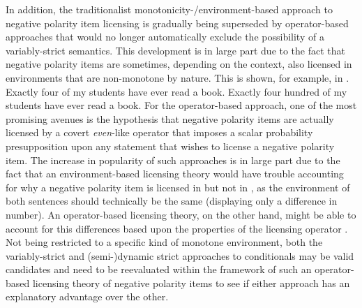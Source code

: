 In addition, the traditionalist monotonicity-/environment-based approach to negative polarity item licensing is gradually being superseded by operator-based approaches \parencite{Lee1994,Lahiri1998,Crnic2011,Crnic2014-dogma,Crnic2014-nm,Jeong2021} that would no longer automatically exclude the possibility of a variably-strict semantics. This development is in large part due to the fact that negative polarity items are sometimes, depending on the context, also licensed in environments that are non-monotone by nature. This is shown, for example, in .
\pex\label{ex:nm-intro}
\a Exactly four of my students have ever read a book.\label{ex:nm-intro1}
\a \ljudge{\#}Exactly four hundred of my students have ever read a book.\label{ex:nm-intro2}
\xe
For the operator-based approach, one of the most promising avenues is the hypothesis that negative polarity items are actually licensed by a covert \textit{even}-like operator that imposes a scalar probability presupposition upon any statement that wishes to license a negative polarity item. The increase in popularity of such approaches is in large part due to the fact that an environment-based licensing theory would have trouble accounting for why a negative polarity item is licensed in  but not in , as the environment of both sentences should technically be the same (displaying only a difference in number). An operator-based licensing theory, on the other hand, might be able to account for this differences based upon the properties of the licensing operator \parencite[see][]{Crnic2011,Crnic2014-nm}. Not being restricted to a specific kind of monotone environment, both the variably-strict and (semi-)dynamic strict approaches to conditionals may be valid candidates and need to be reevaluated within the framework of such an operator-based licensing theory of negative polarity items to see if either approach has an explanatory advantage over the other.

